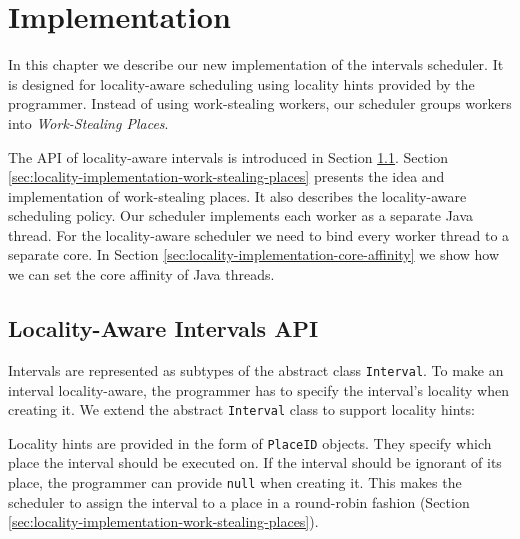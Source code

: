 
\chapter{Implementation}
\label{chap:locality-implementation}

In this chapter we describe our new implementation of the intervals
scheduler. It is designed for locality-aware scheduling using locality
hints provided by the programmer. Instead of using work-stealing
workers, our scheduler groups workers into \emph{Work-Stealing
  Places}.

The API of locality-aware intervals is introduced in Section
\ref{sec:locality-implementation-locality-aware-intervals-api}. Section
\ref{sec:locality-implementation-work-stealing-places} presents the
idea and implementation of work-stealing places. It also describes the
locality-aware scheduling policy. Our scheduler implements each worker
as a separate Java thread. For the locality-aware scheduler we need to
bind every worker thread to a separate core. In Section
\ref{sec:locality-implementation-core-affinity} we show how we can set
the core affinity of Java threads.


\section{Locality-Aware Intervals API}
\label{sec:locality-implementation-locality-aware-intervals-api}

Intervals are represented as subtypes of the abstract class
\lstinline!Interval!. To make an interval locality-aware, the
programmer has to specify the interval's locality when creating it. We
extend the abstract \lstinline!Interval! class to support locality
hints:



Locality hints are provided in the form of \lstinline!PlaceID!
objects. They specify which place the interval should be executed
on. If the interval should be ignorant of its place, the programmer
can provide \lstinline!null! when creating it. This makes the
scheduler to assign the interval to a place in a round-robin fashion
(Section \ref{sec:locality-implementation-work-stealing-places}).

